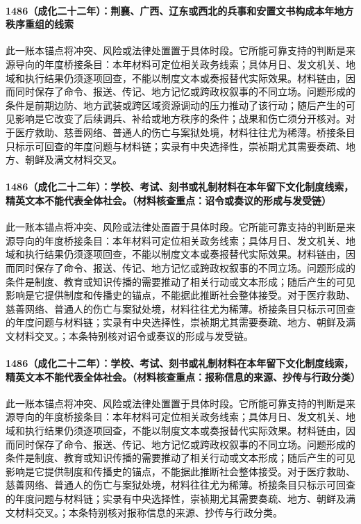 \paragraph{1486（成化二十二年）：荆襄、广西、辽东或西北的兵事和安置文书构成本年地方秩序重组的线索} 此一账本锚点将冲突、风险或法律处置置于具体时段。它所能可靠支持的判断是来源导向的年度桥接条目：本年材料可定位相关政务线索；具体月日、发文机关、地域和执行结果仍须逐项回查，不能以制度文本或奏报替代实际效果。材料链由，因而同时保存了命令、报送、传记、地方记忆或跨政权叙事的不同立场。问题形成的条件是前期边防、地方武装或跨区域资源调动的压力推动了该行动；随后产生的可见影响是它改变了后续调兵、补给或地方秩序的条件；战果和伤亡须分开核对。对于医疗救助、慈善网络、普通人的伤亡与案狱处境，材料往往尤为稀薄。桥接条目只标示可回查的年度问题与材料链；实录有中央选择性，崇祯期尤其需要奏疏、地方、朝鲜及满文材料交叉。

\paragraph{1486（成化二十二年）：学校、考试、刻书或礼制材料在本年留下文化制度线索，精英文本不能代表全体社会。（材料核查重点：诏令或奏议的形成与发受链）} 此一账本锚点将冲突、风险或法律处置置于具体时段。它所能可靠支持的判断是来源导向的年度桥接条目：本年材料可定位相关政务线索；具体月日、发文机关、地域和执行结果仍须逐项回查，不能以制度文本或奏报替代实际效果。材料链由，因而同时保存了命令、报送、传记、地方记忆或跨政权叙事的不同立场。问题形成的条件是制度、教育或知识传播的需要推动了相关行动或文本形成；随后产生的可见影响是它提供制度和传播史的锚点，不能据此推断社会整体接受。对于医疗救助、慈善网络、普通人的伤亡与案狱处境，材料往往尤为稀薄。桥接条目只标示可回查的年度问题与材料链；实录有中央选择性，崇祯期尤其需要奏疏、地方、朝鲜及满文材料交叉。；本条特别核对诏令或奏议的形成与发受链。

\paragraph{1486（成化二十二年）：学校、考试、刻书或礼制材料在本年留下文化制度线索，精英文本不能代表全体社会。（材料核查重点：报称信息的来源、抄传与行政分类）} 此一账本锚点将冲突、风险或法律处置置于具体时段。它所能可靠支持的判断是来源导向的年度桥接条目：本年材料可定位相关政务线索；具体月日、发文机关、地域和执行结果仍须逐项回查，不能以制度文本或奏报替代实际效果。材料链由，因而同时保存了命令、报送、传记、地方记忆或跨政权叙事的不同立场。问题形成的条件是制度、教育或知识传播的需要推动了相关行动或文本形成；随后产生的可见影响是它提供制度和传播史的锚点，不能据此推断社会整体接受。对于医疗救助、慈善网络、普通人的伤亡与案狱处境，材料往往尤为稀薄。桥接条目只标示可回查的年度问题与材料链；实录有中央选择性，崇祯期尤其需要奏疏、地方、朝鲜及满文材料交叉。；本条特别核对报称信息的来源、抄传与行政分类。

